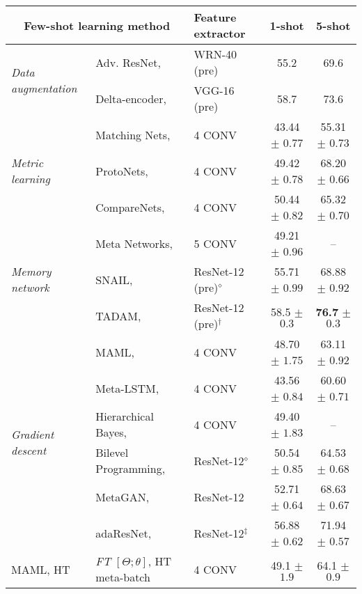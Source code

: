 
\begin{table*}
  \small
  \centering
  \begin{tabular}{l l lcc}
    \toprule
     \multicolumn{2}{c}{Few-shot learning method} & Feature extractor & 1-shot & 5-shot \\
    \midrule
    \multirow{2}{*}{\emph{Data augmentation}}
    & Adv. ResNet, \cite{Mehrotra2017} & WRN-40 (pre) & 55.2 & 69.6 \\
    & Delta-encoder, \cite{SchwartzNIPS18} & VGG-16 (pre) & 58.7 & 73.6 \\
    \midrule  
    \multirow{3}{*}{\emph{Metric learning}}
    &Matching Nets, \cite{VinyalsBLKW16} & 4 CONV & 43.44 $\pm$ $0.77$ & 55.31 $\pm$  $0.73$ \\
    &ProtoNets, \cite{SnellSZ17} & 4 CONV & 49.42 $\pm$ $0.78$ & 68.20 $\pm$ $0.66$\\
    &CompareNets, \cite{SungCVPR2018} & 4 CONV & 50.44 $\pm$ $0.82$ & 65.32 $\pm$ $0.70$\\
         \midrule
    \multirow{3}{*}{\emph{Memory network}} 
    & Meta Networks, \cite{MunkhdalaiICML2017} & 5 CONV  & 49.21 $\pm$ $0.96$ & -- \\
    & SNAIL, \cite{MishraICLR2018} & ResNet-12 (pre)${}^{\diamond}$  & 55.71 $\pm$ $0.99$  & 68.88 $\pm$ $0.92$\\
    & TADAM, \cite{OreshkinNIPS18} & ResNet-12 (pre)${}^{\dag}$  & 58.5 $\pm$ $0.3$  & \textbf{76.7} $\mathbf{\pm}$ $\mathbf{0.3}$\\
    \midrule
    \multirow{6}{*}{\emph{Gradient descent}}
    & MAML, \cite{FinnAL17} & 4 CONV & 48.70 $\pm$ $1.75$ & 63.11 $\pm$ $0.92$ \\
    & Meta-LSTM, \cite{RaviICLR2017} & 4 CONV & 43.56 $\pm$ $0.84$ & 60.60 $\pm$ $0.71$ \\
    & Hierarchical Bayes, \cite{GrantICLR2018} & 4 CONV  & 49.40 $\pm$ $1.83$ & -- \\
    & Bilevel Programming, \cite{FranceschiICML18} & ResNet-12${}^{\diamond}$   & 50.54 $\pm$ $0.85$  & 64.53 $\pm$ $0.68$\\
    & MetaGAN, \cite{ZhangNIPS2018MetaGAN} & ResNet-12 & 52.71 $\pm$ $0.64$  & 68.63 $\pm$ $0.67$ \\
    & adaResNet, \cite{MunkhdalaiICML18} & ResNet-12${}^{\ddag}$   & 56.88 $\pm$ $0.62$ & 71.94 $\pm$ $0.57$ \\
    \midrule
    MAML, HT  & \emph{FT} $[\Theta; \theta]$, HT meta-batch & 4 CONV & 49.1 $\pm$ $1.9$ & 64.1 $\pm$ $0.9$ \\

\end{tabular}
\end{table*}
